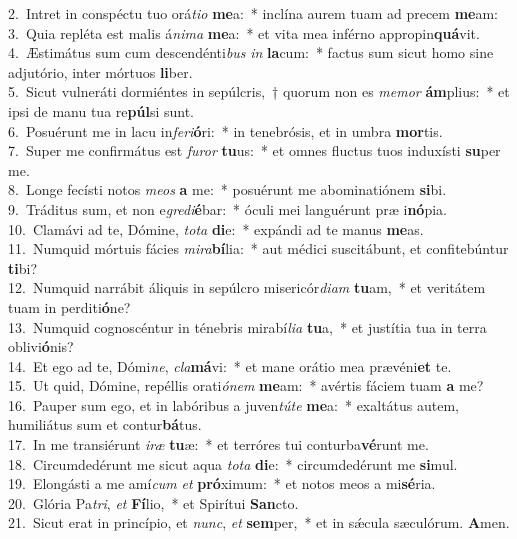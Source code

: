 {2.~}Intret in conspéctu tuo orá\textit{ti}\textit{o} \textbf{me}a:~* inclína aurem tuam ad precem \textbf{me}am:\\
{3.~}Quia repléta est malis á\textit{ni}\textit{ma} \textbf{me}a:~* et vita mea inférno appropin\textbf{quá}vit.\\
{4.~}Æstimátus sum cum descendénti\textit{bus} \textit{in} \textbf{la}cum:~* factus sum sicut homo sine adjutório, inter mórtuos \textbf{li}ber.\\
{5.~}Sicut vulneráti dormiéntes in sepúlcris,~† quorum non es \textit{me}\textit{mor} \textbf{ám}plius:~* et ipsi de manu tua re\textbf{púl}si sunt.\\
{6.~}Posuérunt me in lacu in\textit{fe}\textit{ri}\textbf{ó}ri:~* in tenebrósis, et in umbra \textbf{mor}tis.\\
{7.~}Super me confirmátus est \textit{fu}\textit{ror} \textbf{tu}us:~* et omnes fluctus tuos induxísti \textbf{su}per me.\\
{8.~}Longe fecísti notos \textit{me}\textit{os} \textbf{a} me:~* posuérunt me abominatiónem \textbf{si}bi.\\
{9.~}Tráditus sum, et non e\textit{gre}\textit{di}\textbf{é}bar:~* óculi mei languérunt præ i\textbf{nó}pia.\\
{10.~}Clamávi ad te, Dómine, \textit{to}\textit{ta} \textbf{di}e:~* expándi ad te manus \textbf{me}as.\\
{11.~}Numquid mórtuis fácies \textit{mi}\textit{ra}\textbf{bí}lia:~* aut médici suscitábunt, et confitebúntur \textbf{ti}bi?\\
{12.~}Numquid narrábit áliquis in sepúlcro misericór\textit{di}\textit{am} \textbf{tu}am,~* et veritátem tuam in perditi\textbf{ó}ne?\\
{13.~}Numquid cognoscéntur in ténebris mirabí\textit{li}\textit{a} \textbf{tu}a,~* et justítia tua in terra oblivi\textbf{ó}nis?\\
{14.~}Et ego ad te, Dómi\textit{ne}, \textit{cla}\textbf{má}vi:~* et mane orátio mea prævéni\textbf{et} te.\\
{15.~}Ut quid, Dómine, repéllis orati\textit{ó}\textit{nem} \textbf{me}am:~* avértis fáciem tuam \textbf{a} me?\\
{16.~}Pauper sum ego, et in labóribus a juven\textit{tú}\textit{te} \textbf{me}a:~* exaltátus autem, humiliátus sum et contur\textbf{bá}tus.\\
{17.~}In me transiérunt \textit{i}\textit{ræ} \textbf{tu}æ:~* et terróres tui conturba\textbf{vé}runt me.\\
{18.~}Circumdedérunt me sicut aqua \textit{to}\textit{ta} \textbf{di}e:~* circumdedérunt me \textbf{si}mul.\\
{19.~}Elongásti a me amí\textit{cum} \textit{et} \textbf{pró}ximum:~* et notos meos a mi\textbf{sé}ria.\\
{20.~}Glória Pa\textit{tri}, \textit{et} \textbf{Fí}lio,~* et Spirítui \textbf{San}cto.\\
{21.~}Sicut erat in princípio, et \textit{nunc}, \textit{et} \textbf{sem}per,~* et in sǽcula sæculórum. \textbf{A}men.\\
